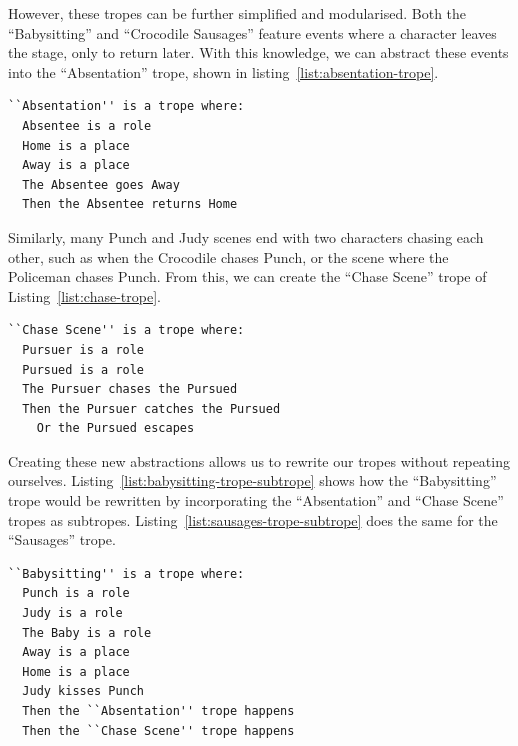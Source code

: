 \documentclass[11pt]{report}
\begin{document}
However, these tropes can be further simplified and modularised. Both the
``Babysitting'' and ``Crocodile Sausages'' feature events where a character
leaves the stage, only to return later. With this knowledge, we can abstract
these events into the ``Absentation'' trope, shown in
listing~\ref{list:absentation-trope}.

\begin{minipage}{\textwidth}
\begin{lstlisting}[label={list:absentation-trope},caption={An ``Absentation'' trope}]
``Absentation'' is a trope where:
  Absentee is a role
  Home is a place 
  Away is a place
  The Absentee goes Away
  Then the Absentee returns Home
\end{lstlisting}
\end{minipage}

Similarly, many Punch and Judy scenes end
with two characters chasing each other, such as when the Crocodile chases Punch,
or the scene where the Policeman chases Punch. From this, we can create the
``Chase Scene'' trope of Listing~\ref{list:chase-trope}.

\begin{minipage}{\textwidth}
\begin{lstlisting}[label={list:chase-trope},caption={A ``Chase Scene'' trope}]
``Chase Scene'' is a trope where:
  Pursuer is a role
  Pursued is a role
  The Pursuer chases the Pursued
  Then the Pursuer catches the Pursued
    Or the Pursued escapes
\end{lstlisting}
\end{minipage}

Creating these new abstractions allows us to rewrite our tropes without
repeating ourselves. Listing~\ref{list:babysitting-trope-subtrope} shows how the
``Babysitting'' trope would be rewritten by incorporating the ``Absentation''
and ``Chase Scene'' tropes as subtropes.
Listing~\ref{list:sausages-trope-subtrope} does the same for the ``Sausages'' trope.

\begin{minipage}{\textwidth}
\begin{lstlisting}[label={list:babysitting-trope-subtrope},caption={The ``Babysitting''
trope, redefined with a subtrope}]
``Babysitting'' is a trope where:
  Punch is a role
  Judy is a role
  The Baby is a role
  Away is a place
  Home is a place
  Judy kisses Punch
  Then the ``Absentation'' trope happens
  Then the ``Chase Scene'' trope happens
\end{lstlisting}
\end{minipage}
\end{document}

